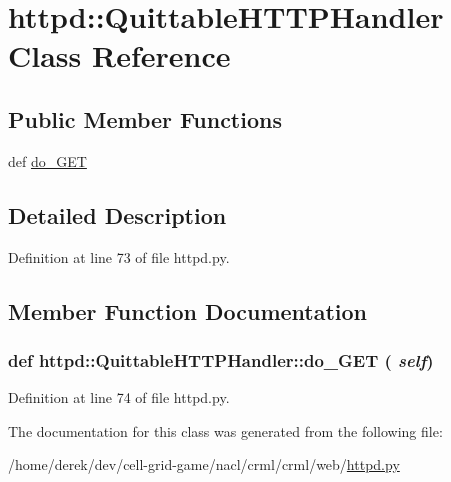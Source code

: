 \hypertarget{classhttpd_1_1_quittable_h_t_t_p_handler}{
\section{httpd::QuittableHTTPHandler Class Reference}
\label{classhttpd_1_1_quittable_h_t_t_p_handler}
}
\subsection*{Public Member Functions}
\begin{DoxyCompactItemize}
\item 
def \hyperlink{classhttpd_1_1_quittable_h_t_t_p_handler_addc36268dbff72748204a5baae7a6e5b}{do\_\-GET}
\end{DoxyCompactItemize}


\subsection{Detailed Description}


Definition at line 73 of file httpd.py.



\subsection{Member Function Documentation}
\hypertarget{classhttpd_1_1_quittable_h_t_t_p_handler_addc36268dbff72748204a5baae7a6e5b}{
\subsubsection[{do\_\-GET}]{\setlength{\rightskip}{0pt plus 5cm}def httpd::QuittableHTTPHandler::do\_\-GET ( {\em self})}}
\label{classhttpd_1_1_quittable_h_t_t_p_handler_addc36268dbff72748204a5baae7a6e5b}


Definition at line 74 of file httpd.py.



The documentation for this class was generated from the following file:\begin{DoxyCompactItemize}
\item 
/home/derek/dev/cell-\/grid-\/game/nacl/crml/crml/web/\hyperlink{httpd_8py}{httpd.py}\end{DoxyCompactItemize}
